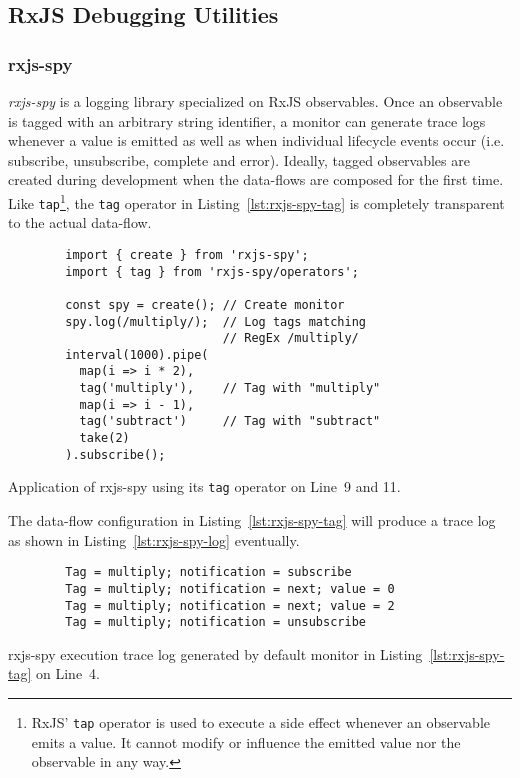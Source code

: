 \documentclass[sigplan,screen,review]{acmart}
\begin{document}
\subsection{RxJS Debugging Utilities}
\label{sec:rxjs-debugging-utilities}

\subsubsection{rxjs-spy}

\emph{rxjs-spy}\cite{rxjsspy} is a logging library specialized on RxJS observables. Once an observable is tagged with an arbitrary string identifier, a monitor can generate trace logs whenever a value is emitted as well as when individual lifecycle events occur (i.e. subscribe, unsubscribe, complete and error). Ideally, tagged observables are created during development when the data-flows are composed for the first time. Like \texttt{tap}\footnote{RxJS' \texttt{tap} operator is used to execute a side effect whenever an observable emits a value. It cannot modify or influence the emitted value nor the observable in any way.}, the \texttt{tag} operator in Listing~\ref{lst:rxjs-spy-tag} is completely transparent to the actual data-flow.

\begin{listing}
	\begin{verbatim}
		import { create } from 'rxjs-spy';
		import { tag } from 'rxjs-spy/operators';

		const spy = create(); // Create monitor
		spy.log(/multiply/);  // Log tags matching
		                      // RegEx /multiply/
		interval(1000).pipe(
		  map(i => i * 2),
		  tag('multiply'),    // Tag with "multiply"
		  map(i => i - 1),
		  tag('subtract')     // Tag with "subtract"
		  take(2)
		).subscribe();
	\end{verbatim}
	\caption{Application of rxjs-spy using its \texttt{tag} operator on Line~9 and 11.}
	\label{lst:rxjs-spy-tag}
\end{listing}

The data-flow configuration in Listing~\ref{lst:rxjs-spy-tag} will produce a trace log as shown in Listing~\ref{lst:rxjs-spy-log} eventually.

\begin{listing}
	\begin{verbatim}
		Tag = multiply; notification = subscribe
		Tag = multiply; notification = next; value = 0
		Tag = multiply; notification = next; value = 2
		Tag = multiply; notification = unsubscribe
	\end{verbatim}
	\caption{rxjs-spy execution trace log generated by default monitor in Listing~\ref{lst:rxjs-spy-tag} on Line~4.}
	\label{lst:rxjs-spy-log}
\end{listing}
\end{document}
